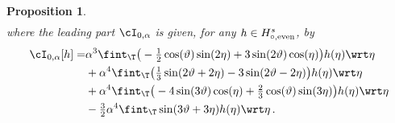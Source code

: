 \documentclass[a4paper,reqno,10pt]{article}
\newtheorem{pro}{Proposition}[section]
\begin{document}
\begin{pro}
\begin{equation}
\begin{aligned}
		\end{aligned}
	\end{equation}
	where the leading part $\cI_{0,\alpha}$ is given, for any $h\in H_{\circ,{\rm even}}^s $, by
   \begin{align}
    \cI_{0,\alpha}[h]  
     =&    \alpha^3 \fint_{\T} \big(-\tfrac12 \cos(\vartheta) \sin(2\eta)+3\sin(2\vartheta)\cos(\eta)\big) h(\eta) \wrt\eta \\
     &
     + \alpha^4 \fint_{\T}\big( \tfrac{1}{3} \sin(2\vartheta+2\eta)  - 3\sin(2\vartheta-2\eta)\big) h(\eta) \wrt\eta \\
     &  + \alpha^4 \fint_{\T} \big(-4 \sin(3\vartheta)\cos(\eta) + \tfrac{2}{3} \cos(\vartheta) \sin(3\eta)  \big)h(\eta) \wrt\eta  \\
     & - \tfrac{3}{2}\alpha^4\fint_{\T}  \sin(3\vartheta+3\eta) h(\eta)\wrt \eta\,.\label{I.0.alpha}
        \end{align}
\end{pro}
\end{document}
